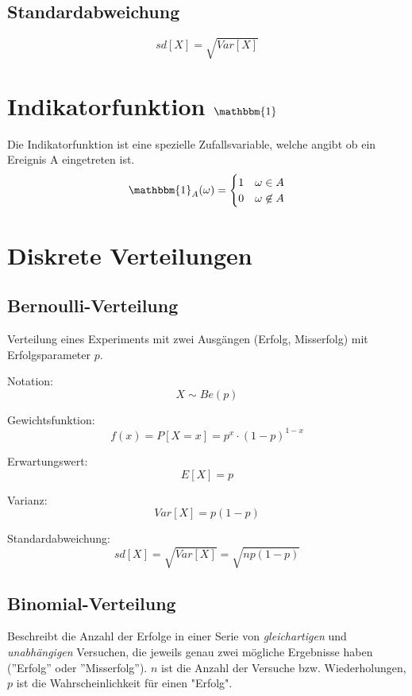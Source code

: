 \documentclass[10pt,a4paper,twocolumn]{article}
\begin{document}
\subsection{Standardabweichung}
\[
sd[X] = \sqrt{Var[X]}
\]

\section{Indikatorfunktion $\mathbbm{1}$}
Die Indikatorfunktion ist eine spezielle Zufallsvariable, welche angibt ob ein Ereignis A eingetreten ist.
\begin{equation}
	\mathbbm{1}_A(\omega) = \begin{cases}
			1 & \omega \in A\\
			0 & \omega \not\in A
		\end{cases}
\end{equation}


\section{Diskrete Verteilungen}

\subsection{Bernoulli-Verteilung}
Verteilung eines Experiments mit zwei Ausgängen (Erfolg, Misserfolg) mit Erfolgsparameter $p$.

\vspace{10pt}

Notation:
\[
X \sim Be(p)
\]

Gewichtsfunktion:
\[
f(x)=P[X=x]=p^x\cdot (1-p)^{1-x}
\]

Erwartungswert:
\[
E[X]=p
\]

Varianz:
\[
Var[X]=p(1-p)
\]

Standardabweichung:
\[
sd[X]=\sqrt{Var[X]}=\sqrt{np(1-p)}
\]

\subsection{Binomial-Verteilung}
Beschreibt die Anzahl der Erfolge in einer Serie von \emph{gleichartigen} und \emph{unabhängigen} Versuchen, die jeweils genau zwei mögliche Ergebnisse haben (''Erfolg'' oder ''Misserfolg''). $n$ ist die Anzahl der Versuche bzw. Wiederholungen, $p$ ist die Wahrscheinlichkeit für einen "Erfolg".

\vspace{10pt}
\end{document}
